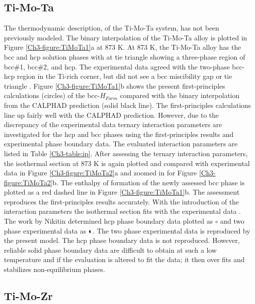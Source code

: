 \subsection{Ti-Mo-Ta}

The thermodynamic description, of the Ti-Mo-Ta system, has not been previously modeled. The binary interpolation of the Ti-Mo-Ta alloy is plotted in Figure \ref{Ch3-figure:TiMoTa1}a at 873 K. At 873 K, the Ti-Mo-Ta alloy has the bcc and hcp solution phases with at tie triangle showing a three-phase region of bcc\#1, bcc\#2, and hcp. The experimental data agreed with the two-phase bcc-hcp region in the Ti-rich corner, but did not see a bcc miscibility gap or tie triangle \cite{Nikitin1971}. Figure \ref{Ch3-figure:TiMoTa1}b shows the present first-principles calculations (circles) of the bcc-$H_{Form}$ compared with the binary interpolation from the CALPHAD prediction (solid black line). The first-principles calculations line up fairly well with the CALPHAD prediction. However, due to the discrepancy of the experimental data ternary interaction parameters are investigated for the hcp and bcc phases using the first-principles results and experimental phase boundary data. The evaluated interaction parameters are listed in Table \ref{Ch3-table:ip}. After assessing the ternary interaction parameters, the isothermal section at 873 K is again plotted and compared with experimental data in Figure \ref{Ch3-figure:TiMoTa2}a and zoomed in for Figure \ref{Ch3-figure:TiMoTa2}b. The enthalpy of formation of the newly assessed bcc phase is plotted as a red dashed line in Figure \ref{Ch3-figure:TiMoTa1}b. The assessment reproduces the first-principles results accurately. With the introduction of the interaction parameters the isothermal section fits with the experimental data \cite{Nikitin1971}. The work by Nikitin \cite{Nikitin1971} determined hcp phase boundary data plotted as $\circ$ and two phase experimental data as $\LEFTcircle$. The two phase experimental data is reproduced by the present model. The hcp phase boundary data is not reproduced. However, reliable solid phase boundary data are difficult to obtain at such a low temperature and if the evaluation is altered to fit the data; it then over fits and stabilizes non-equilibrium phases. 

\subsection{Ti-Mo-Zr}

